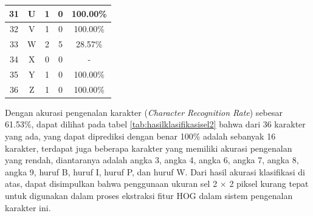 \begin{longtable}[c]{|c|c|c|c|c|}
	31           & U                 & 1                       & 0                       &100.00\%            \\ \hline
	32           & V                 & 1                       & 0                       &100.00\%            \\ \hline
	33           & W                 & 2                       & 5                       &28.57\%            \\ \hline
	34           & X                 & 0                       & 0                       & -            \\ \hline
	35           & Y                 & 1                       & 0                       &100.00\%            \\ \hline
	36           & Z                 & 1                       & 0                       &100.00\%            \\ \hline
\end{longtable}

\noindent Dengan akurasi pengenalan karakter (\textit{Character Recognition Rate}) sebesar 61.53\%, dapat dilihat pada tabel \ref{tab:hasilklasifikasisel2} bahwa dari 36  karakter yang ada, yang dapat diprediksi dengan benar 100\% adalah sebanyak 16 karakter, terdapat juga beberapa karakter yang memiliki akurasi pengenalan yang rendah, diantaranya adalah angka 3, angka 4, angka 6, angka 7, angka 8, angka 9, huruf B, huruf I, huruf P, dan huruf W. Dari hasil akurasi klasifikasi di atas, dapat disimpulkan bahwa penggunaan ukuran sel 2 $\times$ 2 piksel kurang tepat untuk digunakan dalam proses ekstraksi fitur HOG dalam sistem pengenalan karakter ini.\\

